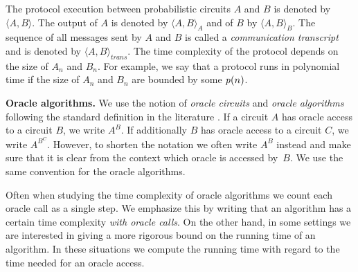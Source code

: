 The protocol execution between probabilistic circuits $A$ and $B$ is denoted by $\langle A, B \rangle$.
The output of $A$ is denoted by $\langle A, B \rangle_A$ and of $B$ by $\langle A, B \rangle_B$.
The sequence of all messages sent by $A$ and $B$ is called a \textit{communication transcript} and
is denoted by $\langle A, B \rangle_{\mathit{trans}}$.
The time complexity of the protocol depends on the size of $A_n$ and $B_n$.
For example, we say that a protocol runs in polynomial time if the size of $A_n$ and $B_n$ are bounded by some $\operatorname{\mathit{p}}(n)$.

\textbf{Oracle algorithms.}
We use the notion of \textit{oracle circuits} and \textit{oracle algorithms} following the standard definition in the literature \cite{Goldreich:2004:FCV:975541, Arora:2009:CCM:1540612}.
If a circuit $A$ has oracle access to a circuit $B$, we write $A^B$. If additionally $B$ has oracle access to a circuit $C$,
we write $A^{B^C}$. However, to shorten the notation we often write $A^{B}$ instead and make sure that it is clear from
the context which oracle is accessed by~$B$. We use the same convention for the oracle algorithms.

Often when studying the time complexity of oracle algorithms we count each oracle call as a single step.
We emphasize this by writing that an algorithm has a certain time complexity \textit{with oracle calls}.
On the other hand, in some settings we are interested in giving a more rigorous bound on the running time of an algorithm.
In these situations we compute the running time with regard to the time needed for an oracle access.


